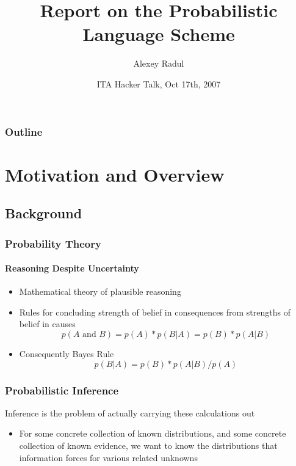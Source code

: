 \documentclass{beamer}
\title[Probabilistic Scheme] %
{Report on the Probabilistic Language Scheme}
\author{Alexey Radul}
\institute[MIT] %
{
  Computer Science and Artificial Intelligence Laboratory\\
  Massachusetts Institute of Technology
}
\date{ITA Hacker Talk, Oct 17th, 2007}
\begin{document}
\begin{frame}
  \titlepage
\end{frame}

\begin{frame}
  \frametitle{Outline}
  \tableofcontents
\end{frame}




\section{Motivation and Overview}

\subsection{Background}

\begin{frame}
  \frametitle{Probability Theory}
  \framesubtitle{Reasoning Despite Uncertainty}

  \begin{itemize}
  \item Mathematical theory of plausible reasoning
  \item Rules for concluding strength of belief in consequences
  from strengths of belief in causes
  \[ p(A \textrm{ and } B) = p(A) * p(B|A) = p(B) * p(A|B) \]
  \item Consequently Bayes Rule
  \[ p(B|A) = p(B) * p(A|B) / p(A) \]
  \end{itemize}
\end{frame}


\begin{frame}
  \frametitle{Probabilistic Inference}

  Inference is the problem of actually carrying these calculations
  out
  \begin{itemize}
  \item For some concrete collection of known distributions, and some concrete
  collection of known evidence, we want to know the distributions that
  information forces for various related unknowns
  \end{itemize}
\end{frame}
\end{document}
